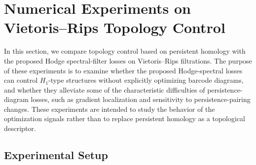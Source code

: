 \documentclass[pdflatex,sn-mathphys-ay]{sn-jnl}%
\theoremstyle{thmstyleone}%
\theoremstyle{thmstyletwo}%
\theoremstyle{thmstylethree}%
\begin{document}






\section{Numerical Experiments on Vietoris--Rips Topology Control}
\label{sec:vr_experiments}

In this section, we compare topology control based on persistent homology with the proposed Hodge spectral-filter losses on Vietoris--Rips filtrations. The purpose of these experiments is to examine whether the proposed Hodge-spectral losses can control \(H_1\)-type structures without explicitly optimizing barcode diagrams, and whether they alleviate some of the characteristic difficulties of persistence-diagram losses, such as gradient localization and sensitivity to persistence-pairing changes.
These experiments are intended to study the behavior of the optimization signals rather than to replace persistent homology as a topological descriptor.

\subsection{Experimental Setup}
\end{document}
